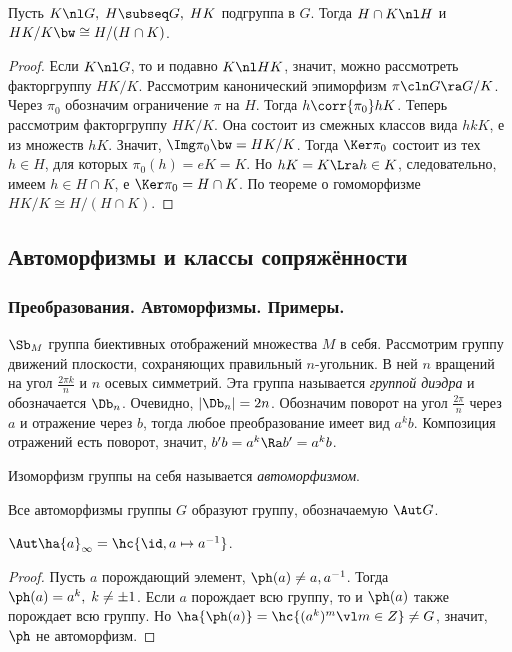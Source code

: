 \documentclass[a4paper]{article}
\begin{document}
\begin{theorem}[Об изоморфизме]
Пусть $K \nl G, \; H \subseq G, \; HK$ подгруппа в $G$. Тогда $H \cap K \nl H$ и $HK/K \bw\cong H/(H\cap K)$.
\end{theorem}
\begin{proof}
Если $K \nl G$, то и подавно $K \nl HK$, значит, можно рассмотреть факторгруппу $HK/K$. Рассмотрим канонический
эпиморфизм $\pi\cln G\ra G/K$. Через $\pi_0$ обозначим ограничение $\pi$ на $H$. Тогда
$h \corr{\pi_0} hK$. Теперь рассмотрим факторгруппу $HK/K$. Она состоит из смежных классов вида $hkK$, е
из множеств $hK$. Значит, $\Img\pi_0 \bw= HK/K$. Тогда $\Ker\pi_0$ состоит из тех $h \in H$, для которых
$\pi_0(h) = eK=K$. Но $hK = K \Lra h \in K$, следовательно, имеем $h \in H \cap K$, е $\Ker \pi_0 = H
\cap K$. По теореме о гомоморфизме $HK/K \cong H/(H \cap K)$.
\end{proof}

\subsection{Автоморфизмы и классы сопряжённости}

\subsubsection{Преобразования. Автоморфизмы. Примеры.}

$\Sb_M$ группа биективных отображений множества $M$ в себя. Рассмотрим группу движений плоскости,
сохраняющих правильный $n$-угольник. В ней $n$ вращений на угол $\frac{2\pi k}{n}$ и $n$ осевых симметрий.
Эта группа называется \emph{\emph{группой диэдра}} и обозначается $\Db_n$. Очевидно, $|\Db_n| = 2n$.
Обозначим поворот на угол $\frac{2\pi}{n}$ через $a$ и отражение через $b$, тогда любое преобразование имеет
вид $a^k b$. Композиция отражений есть поворот, значит, $b'b=a^k \Ra b'=a^k b$.

\begin{df}
Изоморфизм группы на себя называется \emph{автоморфизмом}.
\end{df}
Все автоморфизмы группы $G$ образуют группу, обозначаемую $\Aut G$.

\begin{stm}
$\Aut\ha{a}_\infty = \hc{\id, a \mapsto a^{-1}}$.
\end{stm}
\begin{proof}
Пусть $a$ порождающий элемент, $\ph(a) \neq a, a^{-1}$. Тогда $\ph(a) = a^k, \; k \neq \pm 1$. Если $a$
порождает всю группу, то и $\ph(a)$ также порождает всю группу. Но $\ha{\ph(a)} = \hc{(a^k)^m \vl m
\in Z} \neq G$, значит, $\ph$ не автоморфизм.
\end{proof}
\end{document}
